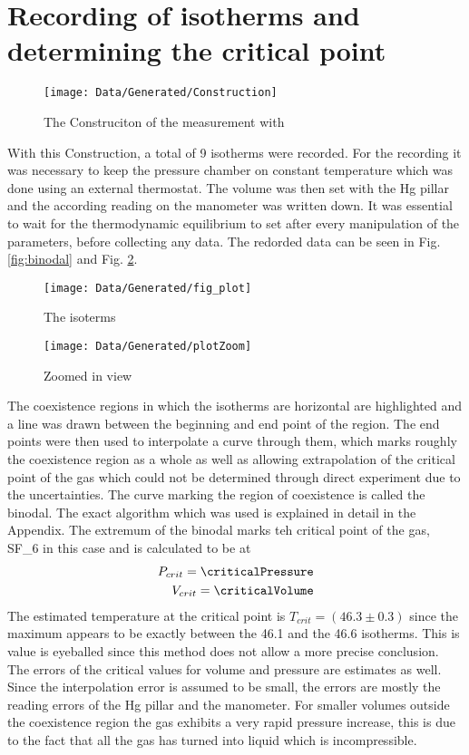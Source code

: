 \documentclass[a4paper,10pt,twocolumn]{article}
\begin{document}
    \section{Recording of isotherms and determining the critical point}\label{sec:Measurement}
    \begin{figure}
        \label{fig:construction}
        \begin{center}
        \texttt{[image: Data/Generated/Construction]}
        \caption[]{The Construciton of the measurement with}
        \end{center}
    \end{figure}
    With this Construction, a total of 9 isotherms were recorded. 
    For the recording it was necessary to keep the pressure chamber on constant temperature which was done using an external thermostat.
    The volume was then set with the Hg pillar and the according reading on the manometer was written down.
    It was essential to wait for the thermodynamic equilibrium to set after every manipulation of the parameters, before collecting any data.
    The redorded data can be seen in Fig. \ref{fig:binodal} and Fig.  \ref{fig:binodalZoom}.
    \begin{figure}
        \begin{center}
            \texttt{[image: Data/Generated/fig\_plot]}\label{fig:binodal}
            \caption[]{The isoterms}
            \texttt{[image: Data/Generated/plotZoom]}\label{fig:binodalZoom}
            \caption[]{Zoomed in view}
        \end{center}
    \end{figure}
    The coexistence regions in which the isotherms are horizontal are highlighted and a line was drawn between the beginning and end point of the region.
    The end points were then used to interpolate a curve through them, which marks roughly the coexistence region as a whole as well as allowing extrapolation of the critical point of the gas which could not be
    determined through direct experiment due to the uncertainties.
    The curve marking the region of coexistence is called the binodal.
    The exact algorithm which was used is explained in detail in the Appendix.
    The extremum of the binodal marks teh critical point of the gas, SF_6\) in this case and is calculated to be at
    \begin{align}
        P_{crit} = \criticalPressure 
        \endline
        V_{crit} = \criticalVolume 
        \end{align}
    The estimated temperature at the critical point is $T_{crit} = (46.3 \pm 0.3)$ since the maximum appears to be exactly between the 46.1\degree\) and the 46.6\degree\) isotherms.
    This is value is eyeballed since this method does not allow a more precise conclusion.
    The errors of the critical values for volume and pressure are estimates as well.
    Since the interpolation error is assumed to be small, the errors are mostly the reading errors of the Hg pillar and the manometer.
    For smaller volumes outside the coexistence region the gas exhibits a very rapid pressure increase, this is due to the fact that all the gas has turned into liquid which is incompressible.
\end{document}

